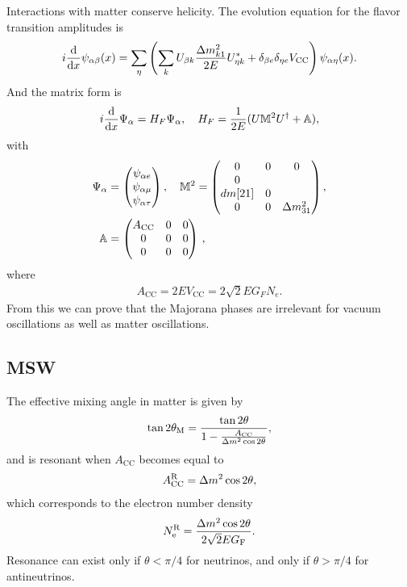 \documentclass[twocolumn]{article}
\renewcommand{\a}{\ensuremath{\alpha}}
\renewcommand{\b}{\ensuremath{\beta}}
\renewcommand{\t}[1]{\ensuremath{\text{{#1}}}}
\newcommand*{\dm}[1][]{%
  \Delta m^2\ifx\\#1\\\else_\text{#1}\fi
}
\begin{document}
Interactions with matter conserve helicity. 
The evolution equation for the flavor transition amplitudes is 
\begin{align*}
  i \dv{}{x}\psi_{\a \b}(x) = \sum_\eta \left( \sum_k U_{\b k} \frac{\dm_{k1}}{2E} U^*_{\eta k} + \delta _{\b e} \delta_{\eta e} V_\text{CC} \right) \psi_{\alpha \eta}(x)
.\end{align*}
And the matrix form is
\begin{align*}
  i \dv{}{x} \Psi_\a = H_F \Psi_\a, \quad H_F = \frac{1}{2E}(U \mathbb{M}^2 U^\dagger + \mathbb{A})
,\end{align*}
with
\begin{align*}
  \Psi_\a &= \begin{pmatrix} \psi_{\a e} \\ \psi_{\a \mu} \\ \psi_{\a \tau} \end{pmatrix} , \quad
  \mathbb{M}^2 = \begin{pmatrix} 0 & 0 & 0 \\
                                 0 & \\dm[21] & 0 \\
                                 0 & 0 & \dm_{31}
                 \end{pmatrix}, \\
    \mathbb{A} &= \begin{pmatrix} A_\text{CC} & 0 & 0 \\
                                 0 & 0 & 0 \\
                                 0 & 0 & 0
                 \end{pmatrix}
\,,\end{align*}
where 
\begin{align*}
  A_\text{CC} = 2EV_\text{CC} = 2 \sqrt{2}E G_F N_e 
.\end{align*}
From this we can prove that the Majorana phases are irrelevant for vacuum oscillations as well as matter oscillations.

\subsection*{MSW}
The effective mixing angle in matter is given by
\begin{align*}
\tan 2\theta_\t{M} = \frac{\tan 2\theta}{1- \frac{A_\text{CC}}{\dm \cos 2\theta}}
,\end{align*}
and is resonant when $A_\text{CC}$ becomes equal to
\begin{align*}
  A^\t{R}_\t{CC} = \dm \cos 2\theta
,\end{align*}
which corresponds to the electron number density
\begin{align*}
  N^\t{R}_\t{e} = \frac{\dm \cos 2\theta}{2\sqrt{2} E G_\t{F} }
.\end{align*}
Resonance can exist only if $\theta < \pi / 4$ for neutrinos, and only if $\theta > \pi / 4$ for antineutrinos. 
\end{document}
